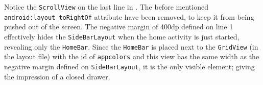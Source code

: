 Notice the \lstinline|ScrollView| on the last line in .
The before mentioned \lstinline{android:layout_toRightOf} attribute have been removed, to keep it from being pushed out of the screen.
The negative margin of 400dp defined on line 1 effectively hides the \lstinline|SideBarLayout| when the home activity is just started, revealing only the \lstinline|HomeBar|.
Since the \lstinline|HomeBar| is placed next to the \lstinline|GridView| (in the layout file) with the id of \lstinline!appcolors! and this view has the same width as the negative margin defined on \lstinline|SideBarLayout|, it is the only visible element; giving the impression of a closed drawer.



  
  



